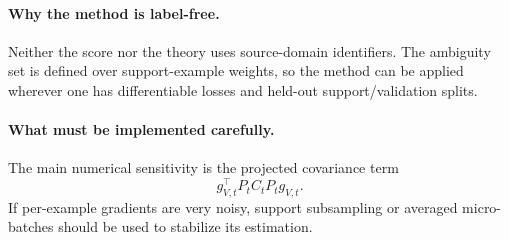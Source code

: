 \documentclass{article}
\begin{document}
\paragraph{Why the method is label-free.}
Neither the score nor the theory uses source-domain identifiers. The ambiguity set is defined over support-example weights, so the method can be applied wherever one has differentiable losses and held-out support/validation splits.

\paragraph{What must be implemented carefully.}
The main numerical sensitivity is the projected covariance term
\begin{equation}
    g_{V,t}^\top P_t C_t P_t g_{V,t}.
\end{equation}
If per-example gradients are very noisy, support subsampling or averaged micro-batches should be used to stabilize its estimation.
\end{document}
